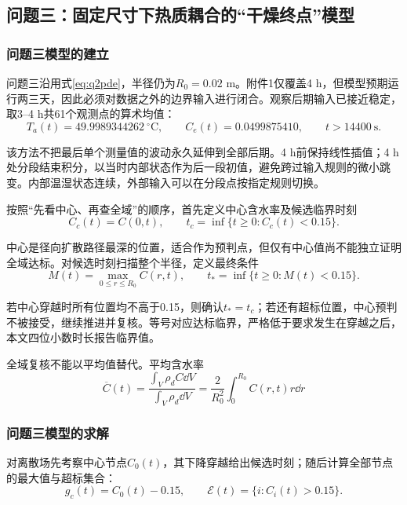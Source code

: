 \subsection{问题三：固定尺寸下热质耦合的“干燥终点”模型}
\subsubsection{问题三模型的建立}
问题三沿用式\eqref{eq:q2pde}，半径仍为$R_0=0.02$ m。附件1仅覆盖4 h，但模型预期运行两三天，因此必须对数据之外的边界输入进行闭合。观察后期输入已接近稳定，取3--4 h共61个观测点的算术均值：
\begin{equation}
T_a(t)=49.9989344262\ ^\circ\mathrm C,\qquad
C_e(t)=0.0499875410,\qquad t>14400\ \mathrm s .
\label{eq:plateau}
\end{equation}

该方法不把最后单个测量值的波动永久延伸到全部后期。4 h前保持线性插值；4 h处分段结束积分，以当时内部状态作为后一段初值，避免跨过输入规则的微小跳变。内部温湿状态连续，外部输入可以在分段点按指定规则切换。

按照“先看中心、再查全域”的顺序，首先定义中心含水率及候选临界时刻
\begin{equation}
C_c(t)=C(0,t),\qquad
t_c=\inf\{t\ge0:C_c(t)<0.15\}.
\end{equation}

中心是径向扩散路径最深的位置，适合作为预判点，但仅有中心值尚不能独立证明全域达标。对候选时刻扫描整个半径，定义最终条件
\begin{equation}
M(t)=\max_{0\le r\le R_0}C(r,t),\qquad
t_*=\inf\{t\ge0:M(t)<0.15\}.
\label{eq:event}
\end{equation}

若中心穿越时所有位置均不高于0.15，则确认$t_*=t_c$；若还有超标位置，中心预判不被接受，继续推进并复核。等号对应达标临界，严格低于要求发生在穿越之后，本文四位小数时长报告临界值。

全域复核不能以平均值替代。平均含水率
\begin{equation}
\overline C(t)=
\frac{\int_V\rho_d C\dd V}{\int_V\rho_d\dd V}
=\frac{2}{R_0^2}\int_0^{R_0}C(r,t)r\dd r
\end{equation}

\subsubsection{问题三模型的求解}
对离散场先考察中心节点$C_0(t)$，其下降穿越给出候选时刻；随后计算全部节点的最大值与超标集合：
\begin{equation}
g_c(t)=C_0(t)-0.15,\qquad
\mathcal E(t)=\{i:C_i(t)>0.15\}.
\end{equation}

